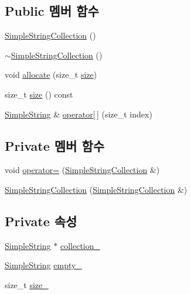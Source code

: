 \subsection*{Public 멤버 함수}
\begin{DoxyCompactItemize}
\item 
\hyperlink{class_simple_string_collection_aa50f537cc57c8c3d36a94ffca76d0705}{Simple\+String\+Collection} ()
\item 
\hyperlink{class_simple_string_collection_a68a228d69f76f9f6e38a7b51c27ecbed}{$\sim$\+Simple\+String\+Collection} ()
\item 
void \hyperlink{class_simple_string_collection_a25357bd817dc453f26a702439bb9c82b}{allocate} (size\+\_\+t \hyperlink{class_simple_string_collection_aac782da1f912bceb5d8ad00c8dc892ac}{size})
\item 
size\+\_\+t \hyperlink{class_simple_string_collection_aac782da1f912bceb5d8ad00c8dc892ac}{size} () const 
\item 
\hyperlink{class_simple_string}{Simple\+String} \& \hyperlink{class_simple_string_collection_a31daedf2fd9937c510d0d44ab4be2d4b}{operator\mbox{[}$\,$\mbox{]}} (size\+\_\+t index)
\end{DoxyCompactItemize}
\subsection*{Private 멤버 함수}
\begin{DoxyCompactItemize}
\item 
void \hyperlink{class_simple_string_collection_a3cefad3d3659547fd1426b1fdbac2d4e}{operator=} (\hyperlink{class_simple_string_collection}{Simple\+String\+Collection} \&)
\item 
\hyperlink{class_simple_string_collection_ae56100791fdbefbfc58c8427d26da7b9}{Simple\+String\+Collection} (\hyperlink{class_simple_string_collection}{Simple\+String\+Collection} \&)
\end{DoxyCompactItemize}
\subsection*{Private 속성}
\begin{DoxyCompactItemize}
\item 
\hyperlink{class_simple_string}{Simple\+String} $\ast$ \hyperlink{class_simple_string_collection_a1d5eea5beddab4b3a1384f36b6fcba16}{collection\+\_\+}
\item 
\hyperlink{class_simple_string}{Simple\+String} \hyperlink{class_simple_string_collection_a2f2d5714c0ff87228405912d39c739a0}{empty\+\_\+}
\item 
size\+\_\+t \hyperlink{class_simple_string_collection_a5f31775800bbb46b35b5791def1f3acc}{size\+\_\+}
\end{DoxyCompactItemize}


